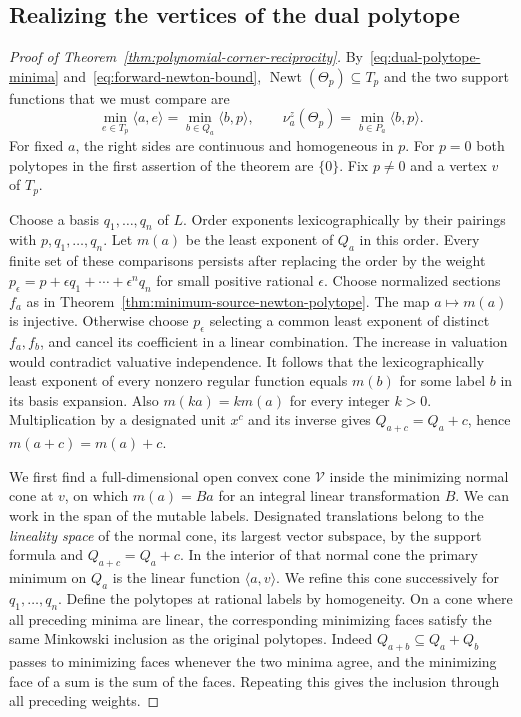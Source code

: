 \documentclass[11pt,reqno]{amsart}
\numberwithin{equation}{section}
\theoremstyle{definition}
\theoremstyle{remark}
\DeclareMathOperator{\Newt}{Newt}
\begin{document}
\subsection{Realizing the vertices of the dual polytope}

\begin{proof}[Proof of Theorem~\ref{thm:polynomial-corner-reciprocity}]
By~\eqref{eq:dual-polytope-minima} and~\eqref{eq:forward-newton-bound},
\(\Newt(\Theta_p)\subseteq T_p\)
and the two support functions that we must compare are
\[ \min_{e\in T_p}\langle a,e\rangle=\min_{b\in Q_a}\langle b,p\rangle, \qquad \nu^z_a(\Theta_p)=\min_{b\in P_a}\langle b,p\rangle . \]
For fixed \(a\), the right sides are continuous and homogeneous
in \(p\). For \(p=0\) both polytopes in the first assertion of the
theorem are \(\{0\}\). Fix \(p\ne0\) and a vertex \(v\) of \(T_p\).

Choose a basis \(q_1,\ldots,q_n\) of \(L\). Order exponents
lexicographically by their pairings with \(p,q_1,\ldots,q_n\).
Let \(m(a)\) be the least exponent of \(Q_a\) in this order.
Every finite set of these comparisons persists after replacing the
order by the weight \(p_\epsilon=p+\epsilon q_1+\cdots+\epsilon^n q_n\)
for small positive rational \(\epsilon\). Choose normalized sections
\(f_a\) as in Theorem~\ref{thm:minimum-source-newton-polytope}.
The map \(a\mapsto m(a)\) is injective. Otherwise choose
\(p_\epsilon\) selecting a common least exponent of distinct
\(f_a,f_b\), and cancel its coefficient in a linear combination.
The increase in valuation would contradict valuative independence.
It follows that the lexicographically least exponent of every
nonzero regular function equals \(m(b)\) for some label \(b\) in
its basis expansion. Also \(m(ka)=km(a)\) for every integer \(k>0\).
Multiplication by a designated unit \(x^c\) and its inverse gives
\(Q_{a+c}=Q_a+c\), hence \(m(a+c)=m(a)+c\).

We first find a full-dimensional open convex cone \(\mathcal V\)
inside the minimizing normal cone at \(v\), on which \(m(a)=Ba\)
for an integral linear transformation \(B\). We can work in the
span of the mutable labels. Designated translations belong to
the \emph{lineality space} of the normal cone, its largest vector
subspace, by the support formula
and \(Q_{a+c}=Q_a+c\). In the interior of that normal cone the
primary minimum on \(Q_a\) is the linear function \(\langle a,v\rangle\).
We refine this cone successively for \(q_1,\ldots,q_n\).
Define the polytopes at rational labels by homogeneity.
On a cone where all preceding minima are linear, the corresponding
minimizing faces satisfy the same Minkowski inclusion as the
original polytopes. Indeed \(Q_{a+b}\subseteq Q_a+Q_b\) passes to
minimizing faces whenever the two minima agree, and the minimizing
face of a sum is the sum of the faces. Repeating this gives the
inclusion through all preceding weights.


\end{proof}
\end{document}
